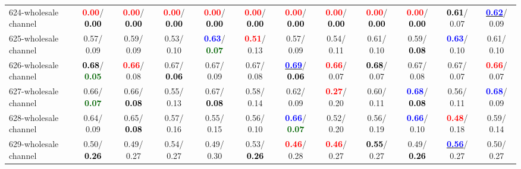\begin{table}[h]
\begin{center}
{\begin{tabular}{lc|c|c|c|c|c|c|c|c|c|c}
624-wholesale channel & \textcolor{red}{\textbf{  0.00}}/\textcolor{black}{\textbf{  0.00}} & \textcolor{red}{\textbf{  0.00}}/\textcolor{black}{\textbf{  0.00}} & \textcolor{red}{\textbf{  0.00}}/\textcolor{black}{\textbf{  0.00}} & \textcolor{red}{\textbf{  0.00}}/\textcolor{black}{\textbf{  0.00}} & \textcolor{red}{\textbf{  0.00}}/\textcolor{black}{\textbf{  0.00}} & \textcolor{red}{\textbf{  0.00}}/\textcolor{black}{\textbf{  0.00}} & \textcolor{red}{\textbf{  0.00}}/\textcolor{black}{\textbf{  0.00}} & \textcolor{red}{\textbf{  0.00}}/\textcolor{black}{\textbf{  0.00}} & \textcolor{red}{\textbf{  0.00}}/\textcolor{black}{\textbf{  0.00}} & \textcolor{black}{\textbf{  0.61}}/  0.07 & \underline{\textcolor{blue}{\textbf{  0.62}}}/  0.09 \\
625-wholesale channel &   0.57/  0.09 &   0.59/  0.09 &   0.53/  0.10 & \textcolor{blue}{\textbf{  0.63}}/\textcolor{darkgreen}{\textbf{  0.07}} & \textcolor{red}{\textbf{  0.51}}/  0.13 &   0.57/  0.09 &   0.54/  0.11 &   0.61/  0.10 &   0.59/\textcolor{black}{\textbf{  0.08}} & \textcolor{blue}{\textbf{  0.63}}/  0.10 &   0.61/  0.10 \\
626-wholesale channel & \textcolor{black}{\textbf{  0.68}}/\textcolor{darkgreen}{\textbf{  0.05}} & \textcolor{red}{\textbf{  0.66}}/  0.08 &   0.67/\textcolor{black}{\textbf{  0.06}} &   0.67/  0.09 &   0.67/  0.08 & \underline{\textcolor{blue}{\textbf{  0.69}}}/\textcolor{black}{\textbf{  0.06}} & \textcolor{red}{\textbf{  0.66}}/  0.07 & \textcolor{black}{\textbf{  0.68}}/  0.07 &   0.67/  0.08 &   0.67/  0.07 & \textcolor{red}{\textbf{  0.66}}/  0.07 \\
627-wholesale channel &   0.66/\textcolor{darkgreen}{\textbf{  0.07}} &   0.66/\textcolor{black}{\textbf{  0.08}} &   0.55/  0.13 &   0.67/\textcolor{black}{\textbf{  0.08}} &   0.58/  0.14 &   0.62/  0.09 & \textcolor{red}{\textbf{  0.27}}/  0.20 &   0.60/  0.11 & \textcolor{blue}{\textbf{  0.68}}/\textcolor{black}{\textbf{  0.08}} &   0.56/  0.11 & \textcolor{blue}{\textbf{  0.68}}/  0.09 \\
628-wholesale channel &   0.64/  0.09 &   0.65/\textcolor{black}{\textbf{  0.08}} &   0.57/  0.16 &   0.55/  0.15 &   0.56/  0.10 & \textcolor{blue}{\textbf{  0.66}}/\textcolor{darkgreen}{\textbf{  0.07}} &   0.52/  0.20 &   0.56/  0.19 & \textcolor{blue}{\textbf{  0.66}}/  0.10 & \textcolor{red}{\textbf{  0.48}}/  0.18 &   0.59/  0.14 \\
629-wholesale channel &   0.50/\textcolor{black}{\textbf{  0.26}} &   0.49/  0.27 &   0.54/  0.27 &   0.49/  0.30 &   0.53/\textcolor{black}{\textbf{  0.26}} & \textcolor{red}{\textbf{  0.46}}/  0.28 & \textcolor{red}{\textbf{  0.46}}/  0.27 & \textcolor{black}{\textbf{  0.55}}/  0.27 &   0.49/\textcolor{black}{\textbf{  0.26}} & \underline{\textcolor{blue}{\textbf{  0.56}}}/  0.27 &   0.50/  0.27 \\ \hline

\end{tabular}}
\end{center}
\end{table}
